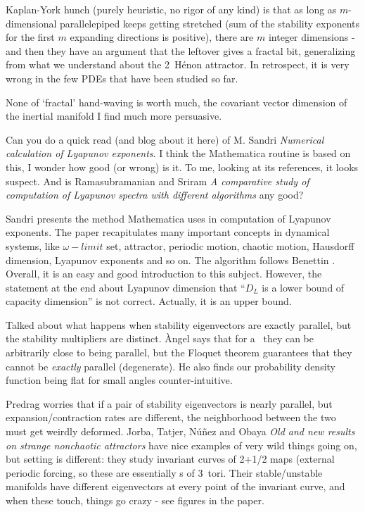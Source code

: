 \begin{description}
Kaplan-York hunch (purely heuristic, no rigor of any kind) is that as
long as $m$-dimensional parallelepiped keeps getting stretched (sum of
the stability exponents for the first $m$ expanding directions is
positive), there are $m$ integer dimensions - and then they have an
argument that the leftover gives a fractal bit, generalizing from what we
understand about the 2\dmn\ H\'enon attractor. In retrospect, it is very wrong
in the few PDEs that have been studied so far.

None of `fractal' hand-waving is worth much, the covariant vector
dimension of the inertial manifold I find much more persuasive.

\item[2016-05-16 Predrag  to Xiong]                         \toCB
Can you do a quick read (and blog about it here) of M. Sandri
{\em Numerical calculation of {Lyapunov} exponents}. I think the
Mathematica routine is based on this, I wonder how good (or wrong) is it.
To me, looking at its references, it looks suspect. And is
Ramasubramanian and Sriram
{\em A comparative study of computation of {Lyapunov} spectra with
different algorithms} any good?

\item[2016-05-17 Xiong]
Sandri presents the method Mathematica uses in computation
of Lyapunov exponents. The paper recapitulates many important concepts in
dynamical systems, like $\omega-limit$ set, attractor, periodic motion,
chaotic motion, Hausdorff dimension, Lyapunov exponents and so on. The
algorithm follows Benettin \etal{}. Overall, it is an easy and
good introduction to this subject. However, the statement at the end
about Lyapunov dimension that ``$D_L$ is a lower bound of capacity
dimension'' is not correct. Actually, it is an upper bound.

\item[2016-05-16 {\`A}ngel Jorba, Predrag, Xiong]
Talked about what happens when stability eigenvectors are exactly
parallel, but the stability multipliers are distinct. {\`A}ngel
says that for a \po\ they can be arbitrarily close to being parallel,
but the Floquet theorem guarantees that they cannot be \emph{exactly}
parallel (degenerate). He also finds our probability density function
being flat for small angles counter-intuitive.

Predrag worries that if a pair of stability eigenvectors is nearly
parallel, but expansion/contraction rates are different, the neighborhood
between the two must get weirdly deformed. Jorba, Tatjer, N{\'{u}\~{n}ez}
and Obaya {\em Old and new results on strange nonchaotic
attractors} have nice examples of very wild things going on, but setting
is different: they study invariant curves of 2+1/2 maps (external
periodic forcing, so these are essentially \PoincSec s of 3\dmn\ tori.
Their stable/unstable manifolds have different eigenvectors at every
point of the invariant curve, and when these touch, things go crazy - see
figures in the paper.


\end{description}
